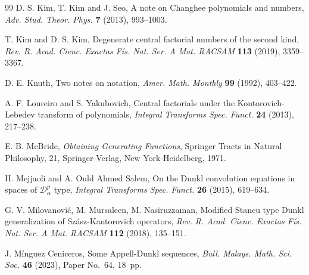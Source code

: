 \documentclass[11pt]{article}
\theoremstyle{plain}
\theoremstyle{remark}
\numberwithin{equation}{section} %
\begin{document}
\begin{thebibliography}{99}
D. S. Kim, T. Kim and J. Seo,
A note on Changhee polynomials and numbers,
\textit{Adv. Stud. Theor. Phys.}
\textbf{7} (2013), 993--1003.

T. Kim and D. S. Kim,
Degenerate central factorial numbers of the second kind,
\textit{Rev. R. Acad. Cienc. Exactas F\'is. Nat. Ser. A Mat. RACSAM}
\textbf{113} (2019), 3359--3367. %

D. E. Knuth, 
Two notes on notation, 
\textit{Amer. Math. Monthly} 
\textbf{99} (1992), 403--422. %

A. F. Loureiro and S. Yakubovich, 
Central factorials under the Kontorovich-Lebedev transform of polynomials, 
\textit{Integral Transforms Spec. Funct.}
\textbf{24} (2013), 217--238.

E. B. McBride, 
\textit{Obtaining Generating Functions}, 
Springer Tracts in Natural Philosophy, 21, Springer-Verlag, 
New York-Heidelberg, 1971.

H. Mejjaoli and A. Ould Ahmed Salem, 
On the Dunkl convolution equations in spaces of $\mathcal{D}_\alpha^p$ type, 
\textit{Integral Transforms Spec. Funct.}
\textbf{26} (2015), 619--634.



G. V. Milovanovi\'c, M. Mursaleen, M. Nasiruzzaman,
{Modified Stancu type Dunkl generalization of Sz\'asz-Kantorovich operators},
\textit{Rev. R. Acad. Cienc. Exactas F\'is. Nat. Ser. A Mat. RACSAM} 
\textbf{112} (2018), 135--151.

J. M\'inguez Ceniceros,
Some Appell-Dunkl sequences,
\textit{Bull. Malays. Math. Sci. Soc.} \textbf{46} (2023), Paper No.~64, 18~pp.


\end{thebibliography}
\end{document}
